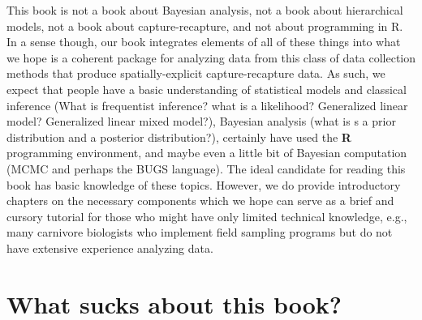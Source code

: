 This book is not a book about Bayesian analysis, not a book about
hierarchical models, not a book about capture-recapture, and not about
programming in R. In a sense though, our book integrates elements of
all of these things into what we hope is a coherent package for
analyzing data from this class of data collection methods
that produce spatially-explicit capture-recapture data.   As such, we
expect that people have a basic understanding of statistical models
and classical inference (What is frequentist inference? what is a
likelihood? Generalized linear model? Generalized linear mixed
model?), 
 Bayesian analysis (what is s a prior distribution and a
posterior distribution?),
certainly have used the {\bf R} programming environment,
and maybe even a little bit
of Bayesian
computation (MCMC and perhaps the BUGS language).
The ideal candidate for reading this book has basic knowledge of these
topics. However, we do provide introductory chapters on the necessary
components which we hope can serve as a brief and cursory tutorial for
those who might have only limited technical knowledge, e.g., many
carnivore biologists who implement field sampling programs but do not
have extensive experience analyzing data.


\section{What sucks about this book?}


